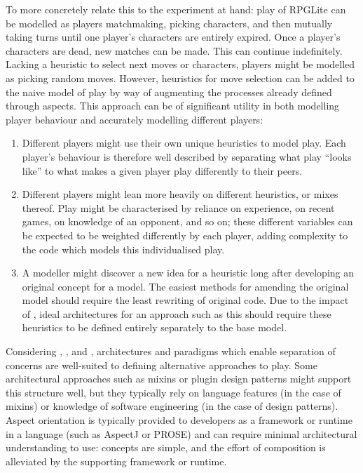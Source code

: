 To more concretely relate this to the experiment at hand: play of RPGLite can be
modelled as players matchmaking, picking characters, and then mutually taking
turns until one player's characters are entirely expired. Once a player's
characters are dead, new matches can be made. This can continue indefinitely.
Lacking a heuristic to select next moves or characters, players might be
modelled as picking random moves. However, heuristics for move selection can be
added to the naive model of play by way of augmenting the processes already
defined through aspects. This approach can be of significant utility in both
modelling player behaviour and accurately modelling different players:

\begin{enumerate}
    \item Different players might use their own unique heuristics to model play.
    Each player's behaviour is therefore well described by separating what play
    ``looks like'' to what makes a given player play differently to their peers.
    \item Different players might lean more heavily on different heuristics, or
    mixes thereof. Play might be characterised by reliance on experience, on
    recent games, on knowledge of an opponent, and so on; these different
    variables can be expected to be weighted differently by each player, adding
    complexity to the code which models this individualised play.
    \item A modeller might discover a new idea for a heuristic long after
    developing an original concept for a model. The easiest methods for amending
    the original model should require the least rewriting of original code. Due
    to the impact of , ideal architectures for an approach such as
    this should require these heuristics to be defined entirely separately to
    the base model.
\end{enumerate}

Considering , , and , architectures and
paradigms which enable separation of concerns are well-suited to defining
alternative approaches to play. Some architectural approaches such as mixins or
plugin design patterns might support this structure well, but they typically
rely on language features (in the case of mixins) or knowledge of software
engineering (in the case of design patterns). Aspect orientation is typically
provided to developers as a framework or runtime in a language (such as
AspectJ\cite{aspectj_intro} or PROSE\cite{popovici2002PROSE}) and can require
minimal architectural understanding to use: concepts are simple, and the effort
of composition is alleviated by the supporting framework or runtime.

